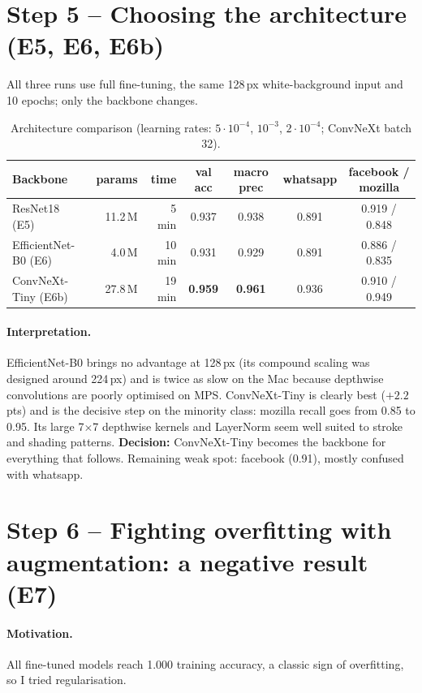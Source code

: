 \documentclass[11pt,a4paper]{article}
\newcommand{\pt}{\,pts}
\begin{document}
\section{Step 5 -- Choosing the architecture (E5, E6, E6b)}

All three runs use full fine-tuning, the same 128\,px white-background input and 10 epochs; only the
backbone changes.

\begin{table}[H]
\centering\small
\begin{tabular}{lrrcccc}
\toprule
Backbone & params & time & val acc & macro prec & whatsapp & facebook / mozilla \\
\midrule
ResNet18 (E5)        & 11.2\,M & 5 min  & 0.937 & 0.938 & 0.891 & 0.919 / 0.848 \\
EfficientNet-B0 (E6) & 4.0\,M  & 10 min & 0.931 & 0.929 & 0.891 & 0.886 / 0.835 \\
ConvNeXt-Tiny (E6b)  & 27.8\,M & 19 min & \textbf{0.959} & \textbf{0.961} & 0.936 & 0.910 / 0.949 \\
\bottomrule
\end{tabular}
\caption{Architecture comparison (learning rates: $5\cdot10^{-4}$, $10^{-3}$, $2\cdot10^{-4}$; ConvNeXt batch 32).}
\end{table}

\paragraph{Interpretation.} EfficientNet-B0 brings no advantage at 128\,px (its compound scaling was
designed around 224\,px) and is twice as slow on the Mac because depthwise convolutions are poorly
optimised on MPS. ConvNeXt-Tiny is clearly best ($+2.2$\pt) and is the decisive step on the minority
class: mozilla recall goes from 0.85 to 0.95. Its large 7$\times$7 depthwise kernels and LayerNorm
seem well suited to stroke and shading patterns. \textbf{Decision:} ConvNeXt-Tiny becomes the
backbone for everything that follows. Remaining weak spot: facebook (0.91), mostly confused with
whatsapp.

\section{Step 6 -- Fighting overfitting with augmentation: a negative result (E7)}

\paragraph{Motivation.} All fine-tuned models reach 1.000 training accuracy, a classic sign of
overfitting, so I tried regularisation.
\end{document}
